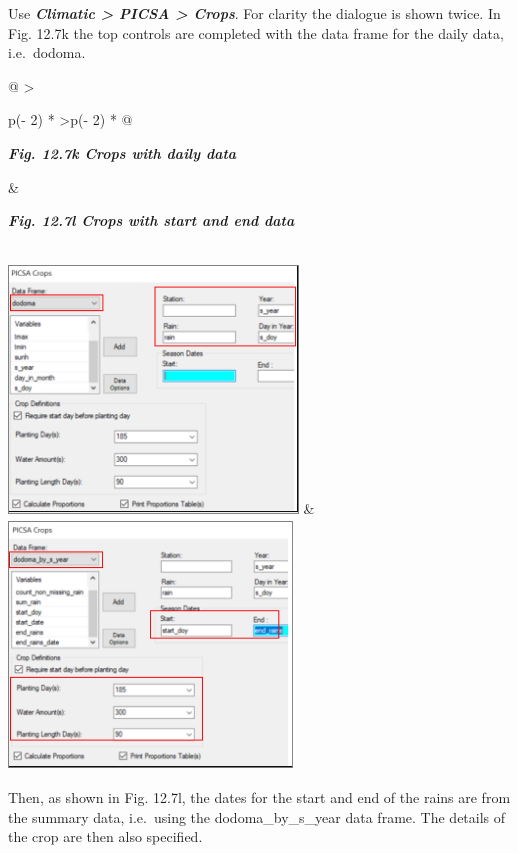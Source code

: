 \documentclass[
  letterpaper,
  DIV=11,
  numbers=noendperiod]{scrreprt}
\begin{document}
Use \textbf{\emph{Climatic \textgreater{} PICSA \textgreater{} Crops}}.
For clarity the dialogue is shown twice. In Fig. 12.7k the top controls
are completed with the data frame for the daily data, i.e.~dodoma.

\begin{longtable}[]{@{}
  >{\raggedright\arraybackslash}p{(\columnwidth - 2\tabcolsep) * }
  >{\raggedleft\arraybackslash}p{(\columnwidth - 2\tabcolsep) * }@{}}
\toprule\noalign{}
\begin{minipage}[b]{\linewidth}\raggedright
\textbf{\emph{Fig. 12.7k Crops with daily data}}
\end{minipage} & \begin{minipage}[b]{\linewidth}\raggedleft
\textbf{\emph{Fig. 12.7l Crops with start and end data}}
\end{minipage} \\
\midrule\noalign{}
\endhead
\bottomrule\noalign{}
\endlastfoot
\includegraphics[width=3.02909in,height=2.60493in]{figures/Fig12.7k.png}
&
\includegraphics[width=2.96668in,height=2.6095in]{figures/Fig12.7l.png} \\
\end{longtable}

Then, as shown in Fig. 12.7l, the dates for the start and end of the
rains are from the summary data, i.e.~using the dodoma\_by\_s\_year data
frame. The details of the crop are then also specified.
\end{document}
